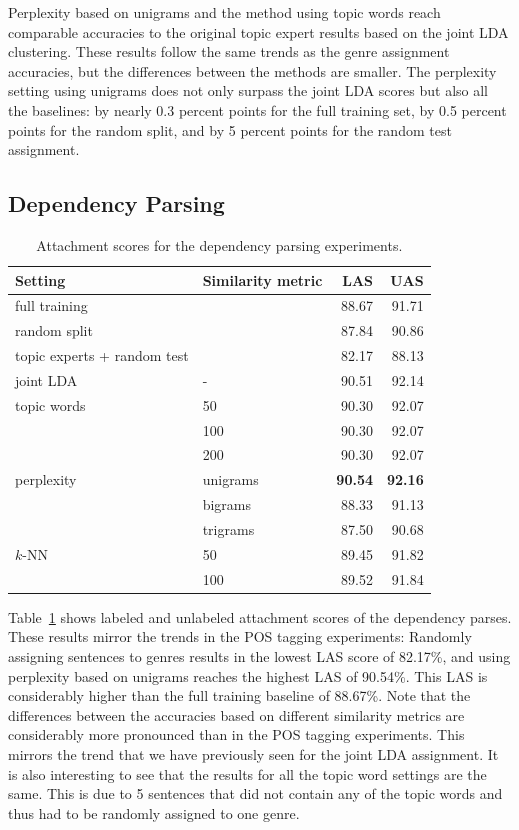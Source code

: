 Perplexity based on unigrams and the method using topic words reach comparable accuracies to the original topic expert results based on the joint LDA clustering. These results follow the same trends as the genre assignment accuracies, but the differences between the methods are smaller. The perplexity setting using unigrams does not only surpass the joint LDA scores but also all the baselines: by nearly 0.3 percent points for the full training set, by 0.5 percent points  for the random split, and by 5 percent points  for the random test assignment.





\subsection{Dependency Parsing}

  \begin{table}[t!]
\centering
\begin{tabular}{l|l|rr|}
Setting &Similarity metric & LAS &UAS \\ \hline
full training & & 88.67 & 91.71 \\ 
random split &  & 87.84 & 90.86 \\ 
topic experts + random test &  & 82.17 & 88.13 \\ \hline
joint LDA & -& 90.51 & 92.14 \\ \hline
topic words & 50 & 90.30 & 92.07 \\
 & 100 & 90.30 & 92.07 \\
 & 200 & 90.30 & 92.07 \\ \hline
perplexity & unigrams & \textbf{90.54} & \textbf{92.16} \\
 & bigrams & 88.33 & 91.13 \\
 & trigrams & 87.50 & 90.68 \\ \hline
$k$-NN  &50 & 89.45 & 91.82 \\
 & 100 & 89.52 & 91.84 \\ \hline
\end{tabular}
\caption{Attachment scores for the dependency parsing experiments.}
\label{tab:overallresultsdep}
\end{table}

Table~\ref{tab:overallresultsdep} shows labeled and unlabeled attachment scores of the dependency parses. These results mirror the trends in the POS tagging experiments: Randomly assigning sentences to genres results in the lowest LAS score of 82.17\%, and using perplexity based on unigrams reaches the highest LAS of 90.54\%. This LAS is considerably higher than the full training baseline of 88.67\%. Note that the differences between the accuracies based on different similarity metrics are considerably more pronounced than in the POS tagging experiments. This mirrors the trend that we have previously seen for the joint LDA assignment. It is also interesting to see that the results for all the topic word settings are the same. This is due to 5 sentences that did not contain any of the topic words and thus had to be randomly assigned to one genre. 



